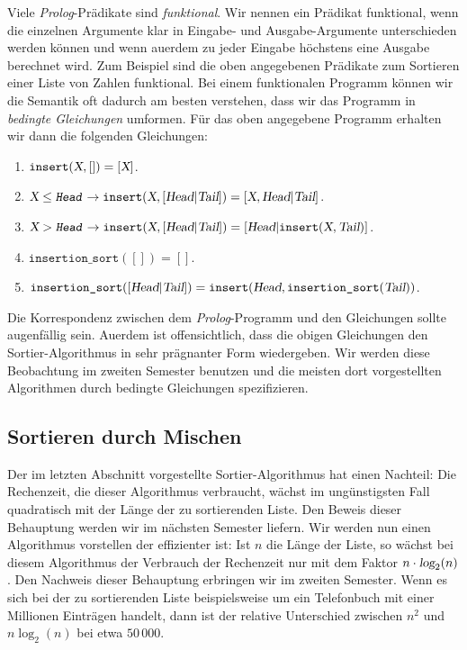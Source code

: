 Viele \textsl{Prolog}-Pr\"{a}dikate sind \emph{funktional}.  
Wir nennen ein Pr\"{a}dikat funktional,
wenn die einzelnen Argumente klar in Eingabe- und Ausgabe-Argumente unterschieden werden
k\"{o}nnen und wenn au\3erdem zu jeder Eingabe h\"{o}chstens eine Ausgabe berechnet wird.
Zum Beispiel sind die oben angegebenen Pr\"{a}dikate zum Sortieren einer Liste von Zahlen funktional.
Bei einem funktionalen Programm k\"{o}nnen wir die Semantik oft dadurch am besten verstehen,
dass wir das Programm in \emph{bedingte Gleichungen} umformen.  F\"{u}r das oben angegebene
Programm erhalten wir dann die folgenden Gleichungen:
\begin{enumerate}
\item $\texttt{insert}( \textsl{X}, []) = [ \textsl{X} ]$. 
\item $\textsl{X} \leq \texttt{\textsl{Head}} \rightarrow \texttt{insert}(\textsl{X}, [ \textsl{Head} | \textsl{Tail} ]) =  [ \textsl{X}, \textsl{Head} | \textsl{Tail} ]$.
\item $\textsl{X} > \texttt{\textsl{Head}} \rightarrow \texttt{insert}(\textsl{X}, [ \textsl{Head} | \textsl{Tail} ]) =  [ \textsl{Head} | \texttt{insert}(\textsl{X}, \textsl{Tail}) ]$.
\item $\texttt{insertion\_sort}([]) = []$.
\item $\texttt{insertion\_sort}([ \textsl{Head} | \textsl{Tail} ]) = \texttt{insert}(\textsl{Head}, \texttt{insertion\_sort}(\textsl{Tail}))$.
\end{enumerate}
Die Korrespondenz zwischen dem \textsl{Prolog}-Programm und den Gleichungen sollte
augenf\"{a}llig sein.  Au\3erdem ist offensichtlich, dass die obigen Gleichungen 
den Sortier-Algorithmus in sehr pr\"{a}gnanter Form wiedergeben.  Wir werden diese Beobachtung
im zweiten Semester benutzen und die meisten dort vorgestellten Algorithmen durch bedingte
Gleichungen spezifizieren. 

\subsection{Sortieren durch Mischen}
Der im letzten Abschnitt vorgestellte Sortier-Algorithmus hat einen Nachteil:  Die Rechenzeit,
die dieser Algorithmus verbraucht, w\"{a}chst im ung\"{u}nstigsten Fall quadratisch mit der L\"{a}nge der zu sortierenden 
Liste.  Den Beweis dieser Behauptung werden wir im n\"{a}chsten Semester liefern.
Wir werden nun einen Algorithmus vorstellen der effizienter ist:  Ist $n$ die L\"{a}nge der
Liste, so w\"{a}chst bei diesem Algorithmus der Verbrauch der 
Rechenzeit nur mit dem Faktor $n \cdot \textsl{log}_2(n)$.  Den Nachweis dieser Behauptung
erbringen wir im zweiten Semester.
Wenn es sich bei der zu sortierenden Liste beispielsweise um ein Telefonbuch mit einer
Millionen Eintr\"{a}gen handelt, dann ist der relative Unterschied zwischen $n^2$ und $n \log_2(n)$ bei
etwa $50\,000$. 

